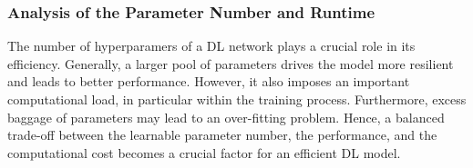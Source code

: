 \documentclass[10pt,journal,compsoc]{IEEEtran}
\begin{document}



\subsubsection{Analysis of the Parameter Number and Runtime}

The number of hyperparamers of a DL network plays a crucial role in its efficiency. Generally, a larger pool of parameters drives the model more resilient and leads to better performance. However, it also imposes an important computational load, in particular within the training process. Furthermore, excess baggage of parameters may lead to an over-fitting problem. Hence, a balanced trade-off between the learnable parameter number, the performance, and the computational cost becomes a crucial factor for an efficient DL model.
\end{document}
